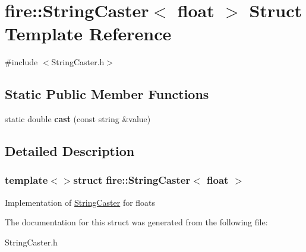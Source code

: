 \hypertarget{a00043}{}\section{fire\+:\+:String\+Caster$<$ float $>$ Struct Template Reference}
\label{a00043}


{\ttfamily \#include $<$String\+Caster.\+h$>$}

\subsection*{Static Public Member Functions}
\begin{DoxyCompactItemize}
\item 
\hypertarget{a00043_a3dbc17ad2b6b2185fea43993871f24f7}{}static double {\bfseries cast} (const string \&value)\label{a00043_a3dbc17ad2b6b2185fea43993871f24f7}

\end{DoxyCompactItemize}


\subsection{Detailed Description}
\subsubsection*{template$<$$>$struct fire\+::\+String\+Caster$<$ float $>$}

Implementation of \hyperlink{a00040}{String\+Caster} for floats 

The documentation for this struct was generated from the following file\+:\begin{DoxyCompactItemize}
\item 
String\+Caster.\+h\end{DoxyCompactItemize}
